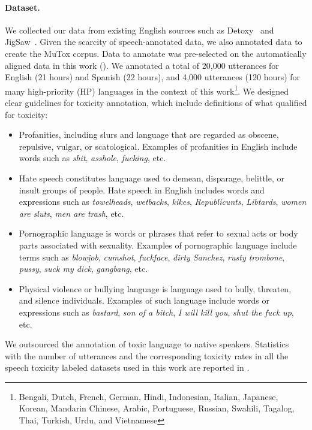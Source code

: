 \paragraph{Dataset.} We collected our data from existing English sources such as Detoxy~\citep{Ghosh2021DeToxyAL} and JigSaw~\citep{jigsaw-dataset}. Given the scarcity of speech-annotated data, we also annotated data to create the MuTox corpus. Data to annotate was pre-selected on the automatically aligned data in this work (). We annotated a total of 20,000 utterances for English (21 hours) and Spanish (22 hours), and 4,000 utterances (120 hours) for many high-priority (HP) languages in the context of this work\footnote{\label{footnote}Bengali, Dutch, French, German, Hindi, Indonesian, Italian, Japanese, Korean, Mandarin Chinese, Arabic, Portuguese, Russian, Swahili, Tagalog, Thai, Turkish, Urdu, and Vietnamese}. We designed clear guidelines for toxicity annotation, which include definitions of what qualified for toxicity: 
\begin{itemize}
\item Profanities, including slurs and language that are regarded as obscene, repulsive, vulgar, or scatological. Examples of profanities in English include words such as \textit{shit}, \textit{asshole}, \textit{fucking}, etc.
\item Hate speech constitutes language used to demean, disparage, belittle, or insult groups of people. Hate speech in English includes words and expressions such as \textit{towelheads}, \textit{wetbacks}, \textit{kikes}, \textit{Republicunts}, \textit{Libtards}, \textit{women are sluts}, \textit{men are trash}, etc.
\item Pornographic language is words or phrases that refer to sexual acts or body parts associated with sexuality. Examples of pornographic language include terms such as \textit{blowjob}, \textit{cumshot}, \textit{fuckface}, \textit{dirty Sanchez}, \textit{rusty trombone}, \textit{pussy}, \textit{suck my dick}, \textit{gangbang}, etc.
\item Physical violence or bullying language is language used to bully, threaten, and silence individuals. Examples of such language include words or expressions such as \textit{bastard}, \textit{son of a bitch}, \textit{I will kill you}, \textit{shut the fuck up}, etc. 
\end{itemize}

We outsourced the annotation of toxic language to native speakers. Statistics with the number of utterances and the corresponding toxicity rates in all the speech toxicity labeled datasets used in this work are reported in . 


